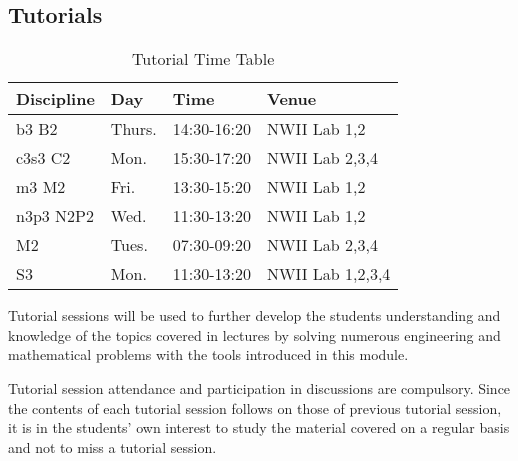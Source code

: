     \subsection{Tutorials}
        \begin{table}[!h]
            \begin{center}
             \begin{tabular}{|l|l|l|l|}
                 \hline
                 {\bf Discipline} & {\bf Day} & {\bf Time} & {\bf Venue} \\
                 \hline
                 b3 B2     & Thurs. & 14:30-16:20 & NWII Lab 1,2 \\
                 c3s3 C2   & Mon.   & 15:30-17:20 & NWII Lab 2,3,4 \\
                 m3 M2     & Fri.   & 13:30-15:20 & NWII Lab 1,2 \\
                 n3p3 N2P2 & Wed.   & 11:30-13:20 & NWII Lab 1,2 \\
                 M2        & Tues.  & 07:30-09:20 & NWII Lab 2,3,4 \\
                 S3        & Mon.   & 11:30-13:20 & NWII Lab 1,2,3,4 \\
                 \hline
             \end{tabular}
             \caption{Tutorial Time Table}
            \end{center}
        \end{table}
        
        Tutorial sessions will be used to further develop the students 
        understanding and knowledge of the topics covered in lectures by
        solving numerous engineering and mathematical problems with the 
        tools introduced in this module.
        
        Tutorial session attendance and participation in discussions are compulsory. 
        Since the contents of each tutorial session follows on those of previous 
        tutorial session, it is in the students’ own interest to study the material 
        covered on a regular basis and not to miss a tutorial session. 

